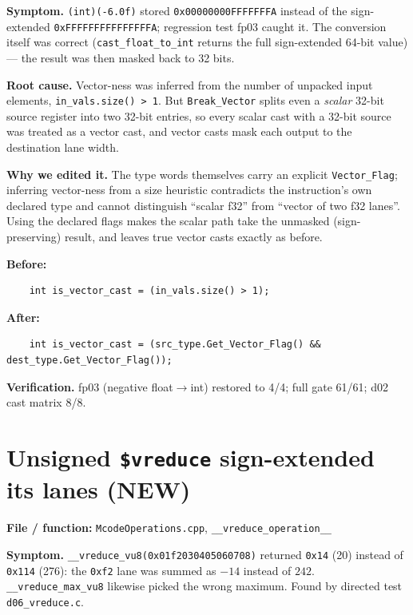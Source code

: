 \documentclass[11pt,a4paper]{report}
\begin{document}
\textbf{Symptom.} \texttt{(int)(-6.0f)} stored \texttt{0x00000000FFFFFFFA}
instead of the sign-extended \texttt{0xFFFFFFFFFFFFFFFA}; regression test
fp03 caught it. The conversion itself was correct
(\texttt{cast\_float\_to\_int} returns the full sign-extended 64-bit value)
--- the result was then masked back to 32 bits.

\textbf{Root cause.} Vector-ness was inferred from the number of unpacked
input elements, \texttt{in\_vals.size() > 1}. But \texttt{Break\_Vector}
splits even a \emph{scalar} 32-bit source register into two 32-bit entries,
so every scalar cast with a 32-bit source was treated as a vector cast, and
vector casts mask each output to the destination lane width.

\textbf{Why we edited it.} The type words themselves carry an explicit
\texttt{Vector\_Flag}; inferring vector-ness from a size heuristic contradicts
the instruction's own declared type and cannot distinguish ``scalar f32''
from ``vector of two f32 lanes''. Using the declared flags makes the scalar
path take the unmasked (sign-preserving) result, and leaves true vector casts
exactly as before.

\textbf{Before:}
\begin{lstlisting}
    int is_vector_cast = (in_vals.size() > 1);
\end{lstlisting}

\textbf{After:}
\begin{lstlisting}
    int is_vector_cast = (src_type.Get_Vector_Flag() && dest_type.Get_Vector_Flag());
\end{lstlisting}

\textbf{Verification.} fp03 (negative float$\to$int) restored to 4/4;
full gate 61/61; d02 cast matrix 8/8.

\section{Unsigned \texttt{\$vreduce} sign-extended its lanes (NEW)}

\textbf{File / function:} \texttt{McodeOperations.cpp},
\texttt{\_\_vreduce\_operation\_\_}

\textbf{Symptom.} \texttt{\_\_vreduce\_vu8(0x01f2030405060708)} returned
\texttt{0x14} (20) instead of \texttt{0x114} (276): the \texttt{0xf2} lane
was summed as $-14$ instead of $242$. \texttt{\_\_vreduce\_max\_vu8} likewise
picked the wrong maximum. Found by directed test \texttt{d06\_vreduce.c}.
\end{document}

